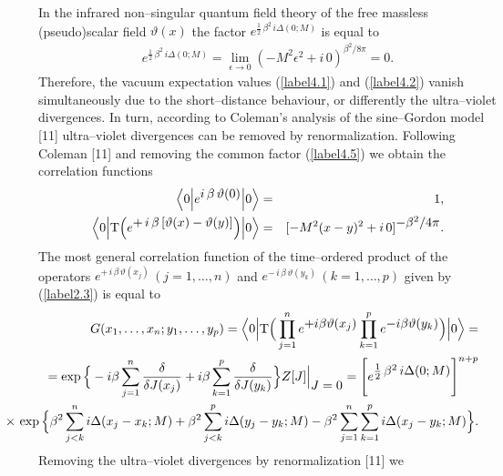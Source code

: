 \documentclass[a4paper,12pt] {article}
\begin{document}
In the infrared non--singular quantum field theory of the free
massless (pseudo)scalar field $\vartheta(x)$ the factor $e^{\textstyle
\frac{1}{2}\,\beta^2\,i\Delta(0;M)}$ is equal to
%
\begin{eqnarray}\label{label4.5}
e^{\textstyle \frac{1}{2}\,\beta^2\,i\Delta(0;M)} = \lim_{\textstyle
\epsilon \to 0}(-M^2\epsilon^2 + i\,0)^{\textstyle \beta^2/8\pi} = 0.
\end{eqnarray}
%
Therefore, the vacuum expectation values (\ref{label4.1}) and
(\ref{label4.2}) vanish simultaneously due to the short--distance
behaviour, or differently the ultra--violet divergences. In turn,
according to Coleman's analysis of the sine--Gordon model [11]
ultra--violet divergences can be removed by renormalization. Following
Coleman [11] and removing the common factor (\ref{label4.5}) we obtain
the correlation functions
%
\begin{eqnarray}\label{label4.6}
\Big\langle 0\Big|e^{\textstyle
i\,\beta\,\vartheta(0)}\Big|0\Big\rangle &=& 1,\nonumber\\ \Big\langle
0\Big|{\rm T}\Big(e^{\textstyle +\,i\,\beta\,[\vartheta(x) -
\vartheta(y)]}\Big)\Big|0\Big\rangle &=&[-M^2(x-y)^2 +
i\,0]^{\textstyle - \beta^2/4\pi}.
\end{eqnarray}
%
The most general correlation function of the time--ordered product of
the operators $e^{\textstyle +\,i\,\beta\,\vartheta(x_j)}\,(j =
1,\ldots,n)$ and $e^{\textstyle -\,i\,\beta\,\vartheta(y_k)}\,(k =
1,\ldots,p)$ given by (\ref{label2.3}) is equal to
%
\begin{eqnarray}\label{label4.7}
\hspace{-0.7in}&&G(x_1,\ldots,x_n;y_1,\ldots,y_p)= \Big\langle
0\Big|{\rm T}\Big(\prod^n_{j=1}e^{\textstyle +
i\beta\vartheta(x_j)}\prod^p_{k=1}e^{\textstyle
-i\beta\vartheta(y_k)}\Big)\Big|0\Big\rangle=\nonumber\\
\hspace{-0.7in}&&=\exp\Big\{-i\beta\sum^n_{j = 1}\frac{\delta}{\delta
J(x_j)} + i\beta\sum^p_{k = 1}\frac{\delta}{\delta
J(y_k)}\Big\}Z[J]\Big|_{\textstyle J = 0} = \Bigg[e^{\textstyle
\frac{1}{2}\,\beta^2\,i\Delta(0;M)}\Bigg]^{n+p}\nonumber\\
\hspace{-0.7in}&&\times\,\exp\Big\{\beta^2\sum^{n}_{j < k}i\Delta(x_j
- x_k; M) + \beta^2\sum^{p}_{j < k}i\Delta(y_j - y_k; M) -
\beta^2\sum^{n}_{j = 1}\sum^{p}_{k = 1}i\Delta(x_j - y_k; M)\Big\}.
\end{eqnarray}
%
Removing the ultra--violet divergences by renormalization [11] we
\end{document}
